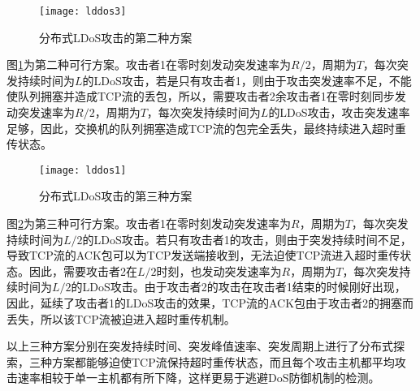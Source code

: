 \begin{figure}
    \centering
    \texttt{[image: lddos3]}
    \caption{分布式LDoS攻击的第二种方案}
    \label{fig:lldos2}
\end{figure}

图\ref{fig:lldos2}为第二种可行方案。攻击者1在零时刻发动突发速率为$R/2$，周期为$T$，每次突发持续时间为$L$的LDoS攻击，若是只有攻击者1，则由于攻击突发速率不足，不能使队列拥塞并造成TCP流的丢包，所以，需要攻击者2余攻击者1在零时刻同步发动突发速率为$R/2$，周期为$T$，每次突发持续时间为$L$的LDoS攻击，攻击突发速率足够，因此，交换机的队列拥塞造成TCP流的包完全丢失，最终持续进入超时重传状态。

\begin{figure}
    \centering
    \texttt{[image: lddos1]}
    \caption{分布式LDoS攻击的第三种方案}
    \label{fig:lldos3}
\end{figure}

图\ref{fig:lldos3}为第三种可行方案。攻击者1在零时刻发动突发速率为$R$，周期为$T$，每次突发持续时间为$L/2$的LDoS攻击。若只有攻击者1的攻击，则由于突发持续时间不足，导致TCP流的ACK包可以为TCP发送端接收到，无法迫使TCP流进入超时重传状态。因此，需要攻击者2在$L/2$时刻，也发动突发速率为$R$，周期为$T$，每次突发持续时间为$L/2$的LDoS攻击。由于攻击者2的攻击在攻击者1结束的时候刚好出现，因此，延续了攻击者1的LDoS攻击的效果，TCP流的ACK包由于攻击者2的拥塞而丢失，所以该TCP流被迫进入超时重传机制。

以上三种方案分别在突发持续时间、突发峰值速率、突发周期上进行了分布式探索，三种方案都能够迫使TCP流保持超时重传状态，而且每个攻击主机都平均攻击速率相较于单一主机都有所下降，这样更易于逃避DoS防御机制的检测。

